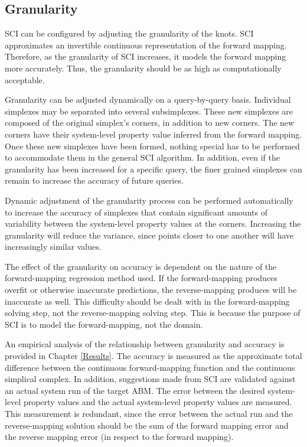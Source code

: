 \subsection{Granularity}
\label{subsec:granularity}

SCI can be configured by adjusting the granularity of the knots.
SCI approximates an invertible continuous representation of the forward mapping.
Therefore, as the granularity of SCI increases, it models the forward mapping more accurately.
Thus, the granularity should be as high as computationally acceptable.

Granularity can be adjusted dynamically on a query-by-query basis.
Individual simplexes may be separated into several subsimplexes.
These new simplexes are composed of the original simplex's corners, in addition to new corners.
The new corners have their system-level property value inferred from the forward mapping.
Once these new simplexes have been formed, nothing special has to be performed to accommodate them in the general SCI algorithm.
In addition, even if the granularity has been increased for a specific query, the finer grained simplexes can remain to increase the accuracy of future queries.

Dynamic adjustment of the granularity process can be performed automatically to increase the accuracy of simplexes that contain significant amounts of variability between the system-level property values at the corners.
Increasing the granularity will reduce the variance, since points closer to one another will have increasingly similar values.

The effect of the granularity on accuracy is dependent on the nature of the forward-mapping regression method used.
If the forward-mapping produces overfit or otherwise inaccurate predictions, the reverse-mapping produces will be inaccurate as well.
This difficulty should be dealt with in the forward-mapping solving step, not the reverse-mapping solving step.
This is because the purpose of SCI is to model the forward-mapping, not the domain.

An empirical analysis of the relationship between granularity and accuracy is provided in Chapter \ref{Results}.
The accuracy is measured as the approximate total difference between the continuous forward-mapping function and the continuous simplical complex.
In addition, suggestions made from SCI are validated against an actual system run of the target ABM.
The error between the desired system-level property values and the actual system-level property values are measured.
This measurement is redundant, since the error between the actual run and the reverse-mapping solution should be the sum of the forward mapping error and the reverse mapping error (in respect to the forward mapping).



